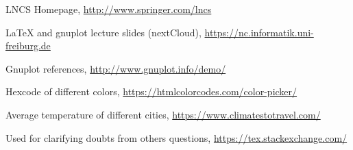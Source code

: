 \documentclass[runningheads]{llncs}
\begin{document}
%
%
%
% 
% 
%
\begin{thebibliography}{8}
LNCS Homepage, \url{http://www.springer.com/lncs}

{\LaTeX} and gnuplot lecture slides (nextCloud), \url{https://nc.informatik.uni-freiburg.de}

Gnuplot references, \url{http://www.gnuplot.info/demo/}

Hexcode of different colors, \url{https://htmlcolorcodes.com/color-picker/}

Average temperature of different cities, \url{https://www.climatestotravel.com/}

Used for clarifying doubts from others questions, \url{https://tex.stackexchange.com/}

\end{thebibliography}
\end{document}
